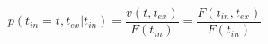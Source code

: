 \begin{equation}
p(t_{in}=t,t_{ex}|t_{in})  = \frac{v(t,t_{ex})}{F(t_{in})}= \frac{F(t_{in},t_{ex})}{F(t_{in})}
\end{equation}